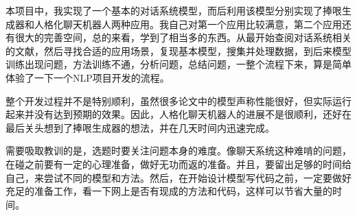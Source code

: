 \documentclass[12pt]{article} %
\begin{document}
\begin{sloppypar}
本项目中，我实现了一个基本的对话系统模型，而后利用该模型分别实现了捧哏生成器和人格化聊天机器人两种应用。我自己对第一个应用比较满意，第二个应用还有很大的完善空间，总的来看，学到了相当多的东西。从最开始查阅对话系统相关的文献，然后寻找合适的应用场景，复现基本模型，搜集并处理数据，到后来模型训练出现问题，方法训练不通，分析问题，总结问题，一整个流程下来，算是简单体验了一下一个NLP项目开发的流程。

整个开发过程并不是特别顺利，虽然很多论文中的模型声称性能很好，但实际运行起来并没有达到预期的效果。因此，人格化聊天机器人的进展不是很顺利，还好在最后关头想到了捧哏生成器的想法，并在几天时间内迅速完成。

需要吸取教训的是，选题时要关注问题本身的难度。像聊天系统这种难啃的问题，在碰之前要有一定的心理准备，做好无功而返的准备。并且，要留出足够的时间给自己，来尝试不同的模型和方法。然后，在开始设计模型写代码之前，一定要做好充足的准备工作，看一下网上是否有现成的方法和代码，这样可以节省大量的时间。



 

\end{sloppypar}
\end{document}
